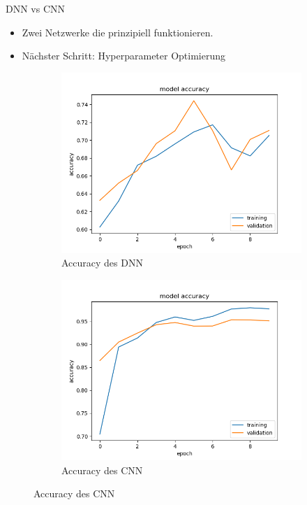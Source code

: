 \documentclass[aspectratio=1610, 9pt]{beamer}
\begin{document}
\begin{frame}{DNN vs CNN}
  \begin{itemize}
  \item Zwei Netzwerke die prinzipiell funktionieren.
  \item Nächster Schritt: Hyperparameter Optimierung
  \end{itemize}

  \begin{figure}
    \centering
    \begin{subfigure}{0.4\textwidth}
      \includegraphics[scale=0.35]{images/dnn_acc2.png}
      \caption{Accuracy des DNN}
      \label{fig:dnn}
    \end{subfigure}
    \begin{subfigure}{0.4\textwidth}
      \includegraphics[scale=0.35]{images/cnn_acc.png}
      \caption{Accuracy des CNN}
      \label{fig:cnn}
    \end{subfigure}
  \end{figure}

\end{frame}
\end{document}
